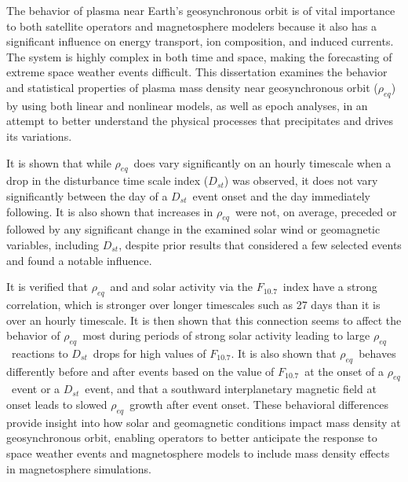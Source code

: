 \documentclass[11 pt]{GMUDissertation}
\newcommand{\req}{\ensuremath{\rho_{eq}}} %
\newcommand{\dst}{\ensuremath{D_{st}}} %
\newcommand{\f}{\ensuremath{F_{10.7}}} %
\begin{document}

\tableofcontents

\listoftables

\listoffigures







\abstractpage


The behavior of plasma near Earth's geosynchronous orbit is of vital importance to both satellite operators and magnetosphere modelers because it also has a significant influence on energy transport, ion composition, and induced currents. The system is highly complex in both time and space, making the forecasting of extreme space weather events difficult. This dissertation examines the behavior and statistical properties of plasma mass density near geosynchronous orbit (\req) by using both linear and nonlinear models, as well as epoch analyses, in an attempt to better understand the physical processes that precipitates and drives its variations. 

It is shown that while \req\ does vary significantly on an hourly timescale when a drop in the disturbance time scale index (\dst) was observed, it does not vary significantly between the day of a \dst\ event onset and the day immediately following. It is also shown that increases in \req\ were not, on average, preceded or followed by any significant change in the examined solar wind or geomagnetic variables, including \dst, despite prior results that considered a few selected events and found a notable influence. 

%

\abstractmultiplepage


It is verified that \req\ and and solar activity via the \f\ index have a strong correlation, which is stronger over longer timescales such as 27 days than it is over an hourly timescale. It is then shown that this connection seems to affect the behavior of \req\ most during periods of strong solar activity leading to large \req\ reactions to \dst\ drops for high values of \f.  It is also shown that \req\ behaves differently before and after events based on the value of \f\ at the onset of a \req\ event or a \dst\ event, and that a southward interplanetary magnetic field at onset leads to slowed \req\ growth after event onset. These behavioral differences provide insight into how solar and geomagnetic conditions impact mass density at geosynchronous orbit, enabling operators to better anticipate the response to space weather events and magnetosphere models to include mass density effects in magnetosphere simulations.
\end{document}
